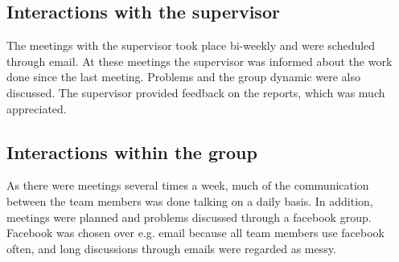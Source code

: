 \normalsize


\subsection{Interactions with the supervisor}
The meetings with the supervisor took place bi-weekly and were scheduled through email. At these meetings the supervisor was informed about the work done since the last meeting. Problems and the group dynamic were also discussed. The supervisor provided feedback on the reports, which was much appreciated.

\subsection{Interactions within the group}
As there were meetings several times a week, much of the communication between the team members was done talking on a daily basis. In addition, meetings were planned and problems discussed through a facebook group. Facebook was chosen over e.g. email because all team members use facebook often, and long discussions through emails were regarded as messy.











